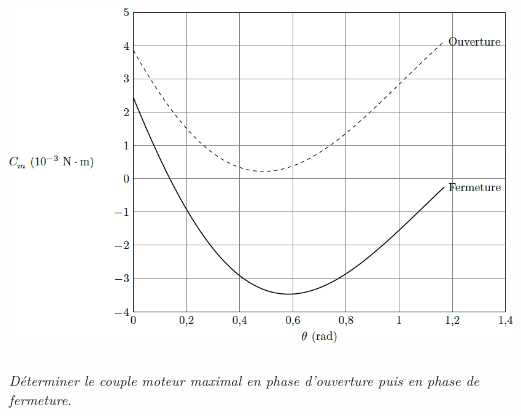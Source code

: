 \documentclass[10pt,fleqn]{article} %
\begin{document}
\begin{multicols}{2}
\begin{multicols}{2}
\begin{center}
\includegraphics[width=\linewidth]{images/fig_04}
\end{center}


\subparagraph{}
\textit{Déterminer le couple moteur maximal en phase d’ouverture puis en phase de fermeture.}
\ifprof
\begin{corrige}~\\

\end{corrige}
\else
\fi

\ifprof
\end{multicols}
\else
\end{multicols}
\fi
\end{document}
